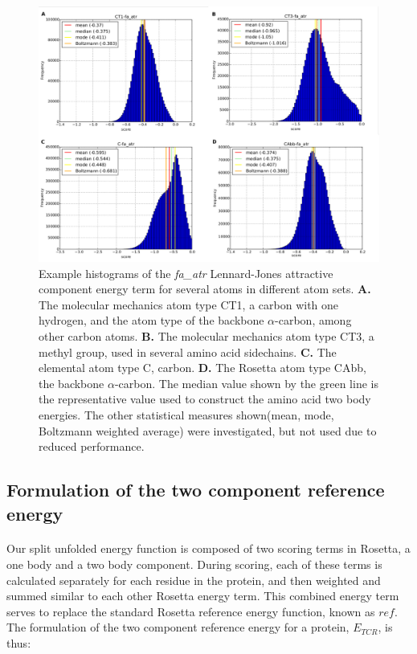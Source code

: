 \begin{figure}
  \includegraphics[width=\linewidth]{Figures/atom_energy_distribution_examples.pdf}
  \caption{Example histograms of the \textit{fa\_atr} Lennard-Jones attractive component energy term for several atoms in different atom sets.
    \textbf{A.} The molecular mechanics atom type CT1, a carbon with one hydrogen, and the atom type of the backbone $\alpha$-carbon, among other carbon atoms.
    \textbf{B.} The molecular mechanics atom type CT3, a methyl group, used in several amino acid sidechains.
    \textbf{C.} The elemental atom type C, carbon.
    \textbf{D.} The Rosetta atom type CAbb, the backbone $\alpha$-carbon.
    The median value shown by the green line is the representative value used to construct the amino acid two body energies.
    The other statistical measures shown(mean, mode, Boltzmann weighted average) were investigated, but not used due to reduced performance.}
  \label{fig:tbaedist}
\end{figure}


\subsection{Formulation of the two component reference energy}
\paragraph{}
Our split unfolded energy function is composed of two scoring terms in Rosetta, a one body and a two body component.
During scoring, each of these terms is calculated separately for each residue in the protein, and then weighted and summed similar to each other Rosetta energy term.
This combined energy term serves to replace the standard Rosetta reference energy function, known as $ref$.
The formulation of the two component reference energy for a protein, $E_{TCR}$, is thus:

